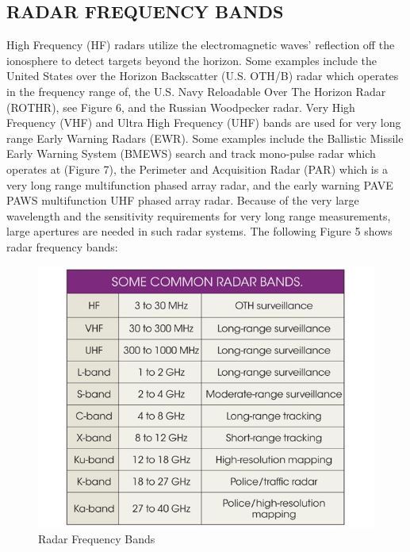 \documentclass[14pt]{article} %
\begin{document}
\subsection{RADAR FREQUENCY BANDS}
High Frequency (HF) radars utilize the electromagnetic waves’ reflection off the ionosphere to detect targets beyond the horizon. Some examples include the United States over the Horizon Backscatter (U.S. OTH/B) radar which operates in the frequency range of, the U.S. Navy Reloadable Over The Horizon Radar (ROTHR), see Figure 6, and the Russian Woodpecker radar. Very High Frequency (VHF) and Ultra High Frequency (UHF) bands are used for very long range Early Warning Radars (EWR). Some examples include the Ballistic Missile Early Warning System (BMEWS) search and track mono-pulse radar which operates at (Figure 7), the Perimeter and Acquisition Radar (PAR) which is a very long range multifunction phased
array radar, and the early warning PAVE PAWS multifunction UHF phased array radar. Because of the very large wavelength and the sensitivity requirements for very long range measurements, large apertures are needed in such radar systems.
\noindent  The following Figure 5 shows radar frequency bands:
\begin{figure}[H]
\centering
\includegraphics[width=0.8\linewidth]{band.jpg}
  \caption{Radar Frequency Bands}
  \label{fig:figure 5}
\end{figure}
\end{document}

